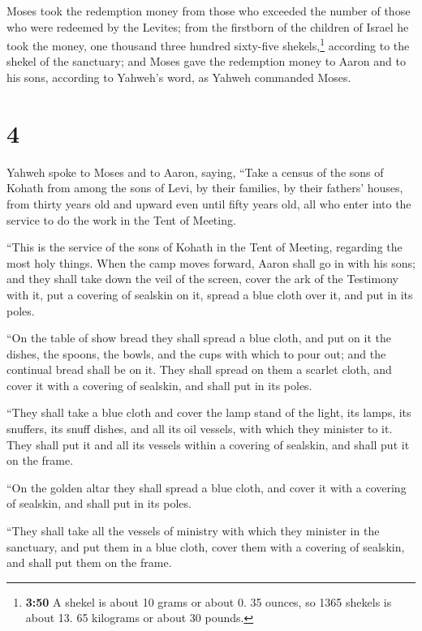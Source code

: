  Moses took the redemption money from those who exceeded
the number of those who were redeemed by the Levites; 
from the firstborn of the children of Israel he took the money, one
thousand three hundred sixty-five shekels,\footnote{\textbf{3:50} A
  shekel is about 10 grams or about 0. 35 ounces, so 1365 shekels is
  about 13. 65 kilograms or about 30 pounds.} according to the shekel of
the sanctuary;  and Moses gave the redemption money to
Aaron and to his sons, according to Yahweh's word, as Yahweh commanded
Moses.

\hypertarget{section-3}{%
\section{4}\label{section-3}}

 Yahweh spoke to Moses and to Aaron, saying,
 ``Take a census of the sons of Kohath from among the sons
of Levi, by their families, by their fathers' houses, 
from thirty years old and upward even until fifty years old, all who
enter into the service to do the work in the Tent of Meeting.

 ``This is the service of the sons of Kohath in the Tent
of Meeting, regarding the most holy things.  When the camp
moves forward, Aaron shall go in with his sons; and they shall take down
the veil of the screen, cover the ark of the Testimony with it,
 put a covering of sealskin on it, spread a blue cloth
over it, and put in its poles.

 ``On the table of show bread they shall spread a blue
cloth, and put on it the dishes, the spoons, the bowls, and the cups
with which to pour out; and the continual bread shall be on it.
 They shall spread on them a scarlet cloth, and cover it
with a covering of sealskin, and shall put in its poles.

 ``They shall take a blue cloth and cover the lamp stand
of the light, its lamps, its snuffers, its snuff dishes, and all its oil
vessels, with which they minister to it.  They shall put
it and all its vessels within a covering of sealskin, and shall put it
on the frame.

 ``On the golden altar they shall spread a blue cloth,
and cover it with a covering of sealskin, and shall put in its poles.

 ``They shall take all the vessels of ministry with which
they minister in the sanctuary, and put them in a blue cloth, cover them
with a covering of sealskin, and shall put them on the frame.

